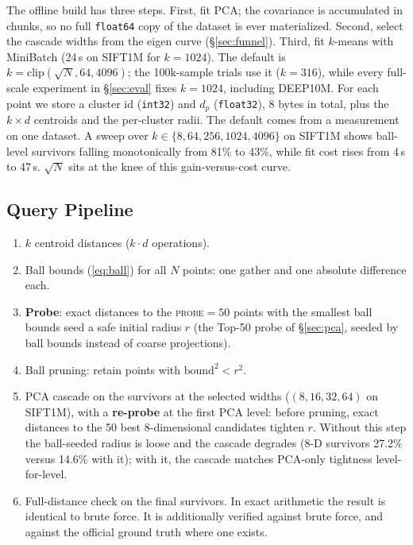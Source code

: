 \documentclass[sigconf, nonacm]{acmart}
\begin{document}
The offline build has three steps. First, fit PCA; the covariance is
accumulated in chunks, so no full \texttt{float64} copy of the dataset is
ever materialized. Second, select the cascade widths from the eigen curve
(\S\ref{sec:funnel}). Third, fit $k$-means with MiniBatch (24\,s on
SIFT1M for $k{=}1024$). The default is
$k = \mathrm{clip}(\sqrt{N}, 64, 4096)$; the 100k-sample trials use it
($k=316$), while every full-scale experiment in \S\ref{sec:eval} fixes
$k = 1024$, including DEEP10M. For each point we store a cluster id
(\texttt{int32}) and $d_p$ (\texttt{float32}), 8 bytes in total, plus the
$k \times d$ centroids and the per-cluster radii. The default comes from
a measurement on one dataset. A sweep over
$k \in \{8, 64, 256, 1024, 4096\}$ on SIFT1M shows ball-level survivors
falling monotonically from 81\% to 43\%, while fit cost rises from 4\,s to
47\,s. $\sqrt{N}$ sits at the knee of this gain-versus-cost curve.

\subsection{Query Pipeline}

\begin{enumerate}
\item $k$ centroid distances ($k \cdot d$ operations).
\item Ball bounds (\ref{eq:ball}) for all $N$ points: one gather and one
  absolute difference each.
\item \textbf{Probe}: exact distances to the \textsc{probe}$=50$ points with
  the smallest ball bounds seed a safe initial radius $r$ (the Top-50
  probe of \S\ref{sec:pca}, seeded by ball bounds instead of coarse
  projections).
\item Ball pruning: retain points with $\mathrm{bound}^2 < r^2$.
\item PCA cascade on the survivors at the selected widths ($(8,16,32,64)$
  on SIFT1M), with a \textbf{re-probe}
  at the first PCA level: before pruning, exact distances to the 50 best
  8-dimensional candidates tighten $r$. Without this step the ball-seeded
  radius is loose and the cascade degrades (8-D survivors 27.2\% versus
  14.6\% with it); with it, the cascade matches PCA-only tightness
  level-for-level.
\item Full-distance check on the final survivors. In exact arithmetic the
  result is identical to brute force. It is additionally verified against
  brute force, and against the official ground truth where one exists.
\end{enumerate}
\end{document}
